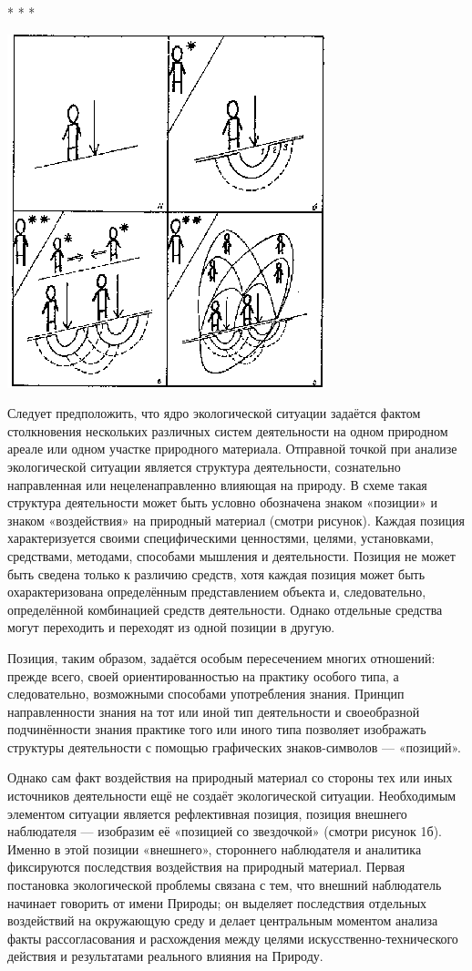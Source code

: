 \documentclass[11pt,a4paper]{article}
\begin{document}
\begin{center}
  * * *

  \includegraphics[width=.5\textwidth]{activity-nature-system.png}
\end{center}

Следует предположить, что ядро экологической ситуации задаётся фактом
столкновения нескольких различных систем деятельности на одном природном
ареале или одном участке природного материала. Отправной точкой при анализе
экологической ситуации является структура деятельности, сознательно
направленная или нецеленаправленно влияющая на природу. В схеме такая
структура деятельности может быть условно обозначена знаком «позиции» и знаком
«воздействия» на природный материал (смотри рисунок). Каждая позиция
характеризуется своими специфическими ценностями, целями, установками,
средствами, методами, способами мышления и деятельности. Позиция не может быть
сведена только к различию средств, хотя каждая позиция может быть
охарактеризована определённым представлением объекта и, следовательно,
определённой комбинацией средств деятельности. Однако отдельные средства могут
переходить и переходят из одной позиции в другую. 

Позиция, таким образом, задаётся особым пересечением многих отношений: прежде
всего, своей ориентированностью на практику особого типа, а следовательно,
возможными способами употребления знания. Принцип направленности знания на тот
или иной тип деятельности и своеобразной подчинённости знания практике того
или иного типа позволяет изображать структуры деятельности с помощью
графических знаков-символов — «позиций». 

Однако сам факт воздействия на природный материал со стороны тех или иных
источников деятельности ещё не создаёт экологической ситуации. Необходимым
элементом ситуации является рефлективная позиция, позиция внешнего наблюдателя
— изобразим её «позицией со звездочкой» (смотри рисунок 1б). Именно в этой
позиции «внешнего», стороннего наблюдателя и аналитика фиксируются последствия
воздействия на природный материал. Первая постановка экологической проблемы
связана с тем, что внешний наблюдатель начинает говорить от имени Природы; он
выделяет последствия отдельных воздействий на окружающую среду и делает
центральным моментом анализа факты рассогласования и расхождения между целями
искусственно-технического действия и результатами реального влияния на
Природу. 
\end{document}
